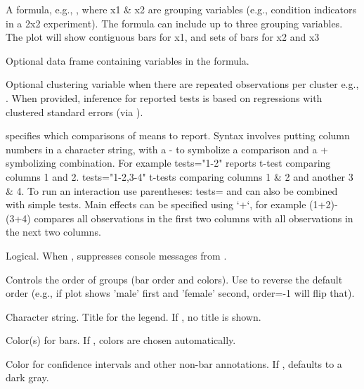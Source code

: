 \documentclass[a4paper]{book}
\begin{document}
\begin{Arguments}
\begin{ldescription}
\item[\code{formula}] A formula, e.g., , where x1 \& x2 are
grouping variables (e.g., condition indicators in a 2x2 experiment). 
The formula can include up to three grouping variables. The plot will 
show contiguous bars for x1, and sets of bars for x2 and x3

\item[\code{data}] Optional data frame containing variables in the formula.

\item[\code{cluster}] Optional clustering variable when there are repeated 
observations per cluster 
e.g., . 
When provided, inference for reported tests is based on regressions with
clustered standard errors (via ).

\item[\code{tests}] specifies which comparisons of means to report. Syntax involves 
putting column numbers in a character string, with a - to symbolize a 
comparison and a + symbolizing combination. For example tests="1-2" reports 
t-test comparing columns 1 and 2. tests="1-2,3-4" t-tests comparing columns 
1 \& 2 and another 3 \& 4. To run an interaction use parentheses:
tests= and can also be combined with simple tests. 
Main effects can be specified using `+`, for example (1+2)-(3+4) compares 
all observations in the first two columns with all observations in 
the next two columns.

\item[\code{quiet}] Logical. When , suppresses console messages from .

\item[\code{order}] Controls the order of  groups (bar order and colors).
Use  to reverse the default order (e.g., if plot shows 'male' first and 'female' second, order=-1 will flip that).

\item[\code{legend.title}] Character string. Title for the legend. If ,
no title is shown.

\item[\code{col}] Color(s) for  bars. If , colors are chosen
automatically.

\item[\code{col.text}] Color for confidence intervals and other non-bar annotations.
If , defaults to a dark gray.


\end{ldescription}
\end{Arguments}
\end{document}
